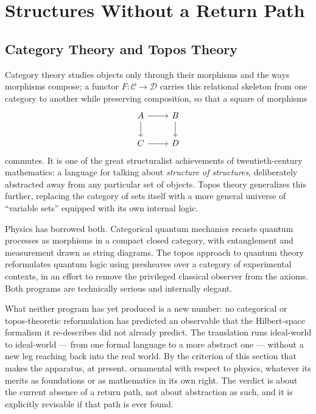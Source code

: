 \section{Structures Without a Return Path}

\subsection{Category Theory and Topos Theory }

Category theory studies objects only through their morphisms and the ways
morphisms compose; a functor $F: \mathcal{C} \to \mathcal{D}$ carries this
relational skeleton from one category to another while preserving composition,
so that a square of morphisms
\[
\begin{tikzcd}
A \arrow[r, ] \arrow[d, '] & B \arrow[d, ] \\
C \arrow[r, '] & D
\end{tikzcd}
\]
commutes. It is one of the great
structuralist achievements of twentieth-century mathematics: a language for
talking about \emph{structure of structures}, deliberately abstracted away from
any particular set of objects. Topos theory generalizes this further, replacing
the category of sets itself with a more general universe of ``variable sets''
equipped with its own internal logic.

Physics has borrowed both. Categorical quantum mechanics recasts quantum
processes as morphisms in a compact closed category, with entanglement and
measurement drawn as string diagrams. The topos approach to quantum theory
reformulates quantum logic using presheaves over a category of experimental
contexts, in an effort to remove the privileged classical observer from the
axioms. Both programs are technically serious and internally elegant.

What neither program has yet produced is a new number: no categorical or
topos-theoretic reformulation has predicted an observable that the
Hilbert-space formalism it re-describes did not already predict. The
translation runs ideal-world to ideal-world --- from one formal language to a
more abstract one --- without a new leg reaching back into the real world. By
the criterion of this section that makes the apparatus, at present, ornamental
with respect to physics, whatever its merits as foundations or as mathematics
in its own right. The verdict is about the current absence of a return path,
not about abstraction as such, and it is explicitly revisable if that path is
ever found.

